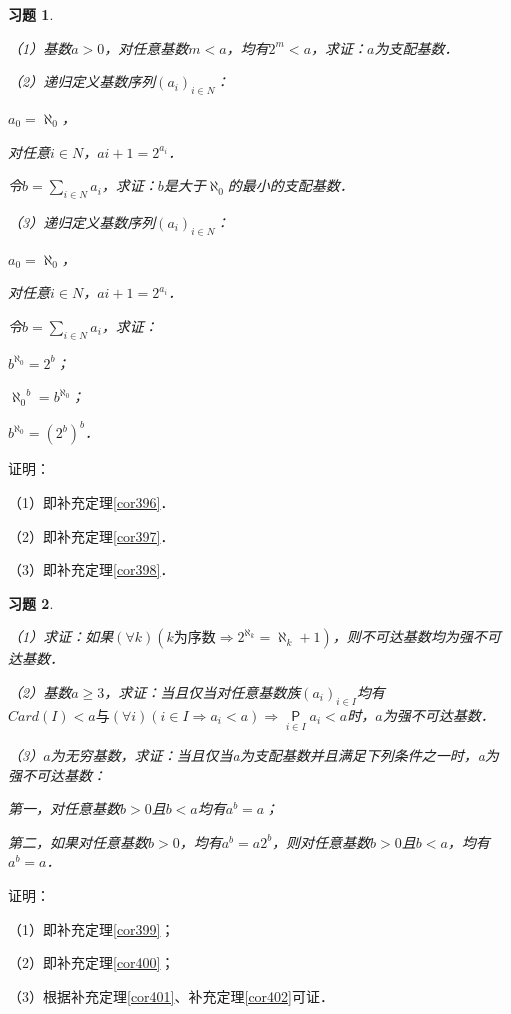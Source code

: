 \documentclass[12pt, a4paper, oneside]{book}
\newtheorem{exer}{习题}
\begin{document}
			\begin{exer}\label{exer176}
				\hfill\par
				（1）基数$a>0$，对任意基数$m<a$，均有$2^m<a$，求证：$a$为支配基数．
				\par
				（2）递归定义基数序列$(a_i)_{i\in N}$：
				\par
				$a_0=\aleph_0$，
				\par
				对任意$i\in N$，$a{i+1}=2^{a_i}$．
				\par
				令$b=\sum\limits_{i\in N}a_i$，求证：$b$是大于$\aleph_0$的最小的支配基数．
				\par
				（3）递归定义基数序列$(a_i)_{i\in N}$：
				\par
				$a_0=\aleph_0$，
				\par
				对任意$i\in N$，$a{i+1}=2^{a_i}$．
				\par
				令$b=\sum\limits_{i\in N}a_i$，求证：
				\par
				$b^{\aleph_0}=2^b$；
				\par
				${\aleph_0}^b=b^{\aleph_0}$；
				\par
				$b^{\aleph_0}=(2^b)^b$．
			\end{exer}
			证明：
			\par
			（1）即补充定理\ref{cor396}．
			\par
			（2）即补充定理\ref{cor397}．
			\par
			（3）即补充定理\ref{cor398}．
			
			\begin{exer}\label{exer177}
				\hfill\par
				（1）求证：如果$(\forall k)(k\text{为序数}\Rightarrow 2^{\aleph_k}=\aleph_k+1)$，则不可达基数均为强不可达基数．
				\par
				（2）基数$a\geq 3$，求证：当且仅当对任意基数族$(a_i)_{i\in I}$均有$Card(I)<a\text{与}(\forall i)(i\in I\Rightarrow a_i<a)\Rightarrow \mathop{\mathsf{P}}\limits_{i\in I}a_i<a$时，$a$为强不可达基数．
				\par
				（3）$a$为无穷基数，求证：当且仅当a为支配基数并且满足下列条件之一时，a为强不可达基数：
				\par
				第一，对任意基数$b>0$且$b<a$均有$a^b=a$；
				\par
				第二，如果对任意基数$b>0$，均有$a^b=a2^b$，则对任意基数$b>0$且$b<a$，均有$a^b=a$．
			\end{exer}
			证明：
			\par
			（1）即补充定理\ref{cor399}；
			\par
			（2）即补充定理\ref{cor400}；
			\par
			（3）根据补充定理\ref{cor401}、补充定理\ref{cor402}可证．
			
\end{document}
